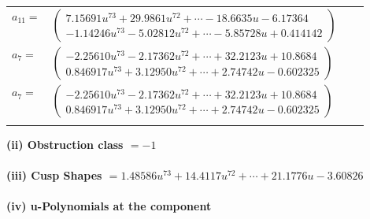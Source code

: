 \documentclass[1p]{elsarticle_modified}
\theoremstyle{definition}
\begin{document}
\begin{tabular}{m{7pt} m{180pt} m{7pt} m{180pt} }
\flushright $a_{11}=$&$\begin{pmatrix}7.15691 u^{73}+29.9861 u^{72}+\cdots-18.6635 u-6.17364\\-1.14246 u^{73}-5.02812 u^{72}+\cdots-5.85728 u+0.414142\end{pmatrix}$ \\
\flushright $a_{7}=$&$\begin{pmatrix}-2.25610 u^{73}-2.17362 u^{72}+\cdots+32.2123 u+10.8684\\0.846917 u^{73}+3.12950 u^{72}+\cdots+2.74742 u-0.602325\end{pmatrix}$\\ \flushright $a_{7}=$&$\begin{pmatrix}-2.25610 u^{73}-2.17362 u^{72}+\cdots+32.2123 u+10.8684\\0.846917 u^{73}+3.12950 u^{72}+\cdots+2.74742 u-0.602325\end{pmatrix}$\\&\end{tabular}
\flushleft \textbf{(ii) Obstruction class $= -1$}\\~\\
\flushleft \textbf{(iii) Cusp Shapes $= 1.48586 u^{73}+14.4117 u^{72}+\cdots+21.1776 u-3.60826$}\\~\\
\newpage\renewcommand{\arraystretch}{1}
\flushleft \textbf{(iv) u-Polynomials at the component}\newline \\
\end{document}

